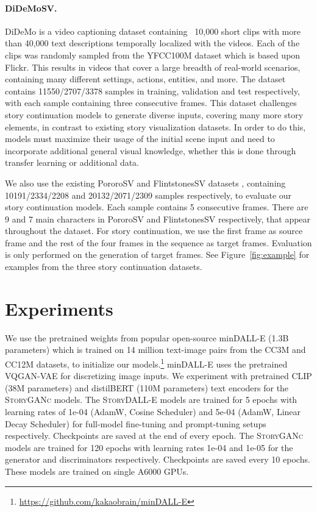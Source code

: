 \documentclass[runningheads]{llncs}
\newcommand{\sdalle}[1]{\textsc{StoryDALL-E}}
\newcommand{\sgan}[1]{\textsc{StoryGANc}}
\begin{document}
\paragraph{DiDeMoSV.}
DiDeMo \cite{hendricks17iccv} is a video captioning dataset containing ~10,000 short clips with more than 40,000 text descriptions temporally localized with the videos. Each of the clips was randomly sampled from the YFCC100M \cite{thomee2016yfcc100m} dataset which is based upon Flickr. This results in videos that cover a large breadth of real-world scenarios, containing many different settings, actions, entities, and more. The dataset contains 11550/2707/3378 samples in training, validation and test respectively, with each sample containing three consecutive frames. This dataset challenges story continuation models to generate diverse inputs, covering many more story elements, in contrast to existing story visualization datasets. In order to do this, models must maximize their usage of the initial scene input and need to incorporate additional general visual knowledge, whether this is done through transfer learning or additional data. 


We also use the existing PororoSV \cite{li2019storygan} and FlintstonesSV datasets \cite{gupta2018imagine}, containing 10191/2334/2208 and 20132/2071/2309 samples respectively, to evaluate our story continuation models. Each sample contains 5 consecutive frames. There are 9 and 7 main characters in PororoSV and FlintstonesSV respectively, that appear throughout the dataset. For story continuation, we use the first frame as source frame and the rest of the four frames in the sequence as target frames. Evaluation is only performed on the generation of target frames. See Figure~\ref{fig:example} for examples from the three story continuation datasets.


\section{Experiments}
We use the pretrained weights from popular open-source minDALL-E (1.3B parameters) which is trained on 14 million text-image pairs from the CC3M \cite{sharma2018conceptual} and CC12M \cite{changpinyo2021conceptual} datasets, to initialize our models.\footnote{\url{https://github.com/kakaobrain/minDALL-E}}
minDALL-E uses the pretrained VQGAN-VAE \cite{esser2021taming} for discretizing image inputs. We experiment with pretrained CLIP \cite{radford2021learning} (38M parameters) and distilBERT \cite{sanh2019distil} (110M parameters) text encoders for the \sgan{} models. The \sdalle{} models are trained for 5 epochs with learning rates of 1e-04 (AdamW, Cosine Scheduler) and 5e-04 (AdamW, Linear Decay Scheduler) for full-model fine-tuning and prompt-tuning setups respectively. Checkpoints are saved at the end of every epoch. The \sgan{} models are trained for 120 epochs with learning rates 1e-04 and 1e-05 for the generator and discriminators respectively. Checkpoints are saved every 10 epochs. These models are trained on single A6000 GPUs. 
\end{document}

